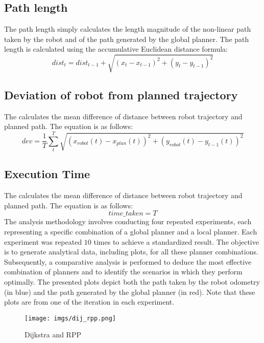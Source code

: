 \documentclass[sigconf]{acmart}
\begin{document}
\subsection{Path length}
The path length simply calculates the length magnitude of the non-linear path taken by the robot and of the path generated by the global planner. The path length is calculated using the accumulative Euclidean distance formula:
\begin{equation*}
    dist_t = dist_{t-1} + \sqrt{(x_t-x_{t-1})^2 + (y_t-y_{t-1})^2} 
\end{equation*}
\subsection{Deviation of robot from planned trajectory}
The calculates the mean difference of distance between robot trajectory and planned path. The equation is as follows:
\begin{equation*}
    dev = \frac{1}{T} \sum_{t}^{T} \sqrt{(x_{robot}(t) - x_{plan}(t))^2 + (y_{robot}(t) - y_{t-1}(t))^2} 
\end{equation*}

\subsection{Execution Time}
The calculates the mean difference of distance between robot trajectory and planned path. The equation is as follows:
\begin{equation*}
    time\_taken = T
\end{equation*}
The analysis methodology involves conducting four repeated experiments, each representing a specific combination of a global planner and a local planner. Each experiment was repeated $10$ times to achieve a standardized result. The objective is to generate analytical data, including plots, for all these planner combinations. Subsequently, a comparative analysis is performed to deduce the most effective combination of planners and to identify the scenarios in which they perform optimally. The presented plots depict both the path taken by the robot odometry (in blue) and the path generated by the global planner (in red). Note that these plots are from one of the iteration in each experiment.
\begin{figure}[H]
  \centering
  \texttt{[image: imgs/dij\_rpp.png]} %
  \caption{Dijkstra and RPP}
  \label{fig:your_label}
\end{figure}
\end{document}
